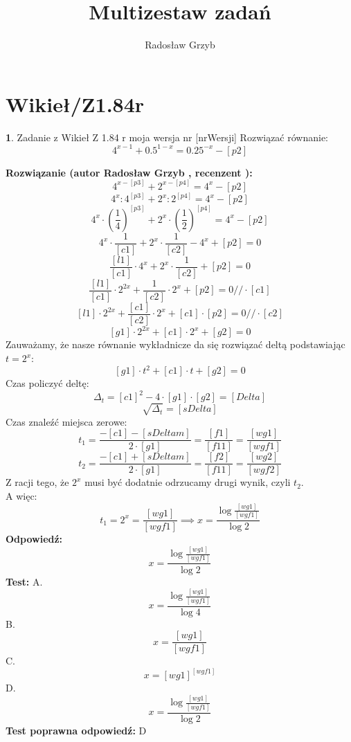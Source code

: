 \documentclass[12pt, a4paper]{article}
\title{Multizestaw zadań}
\author{Radosław Grzyb}
\date{}
\theoremstyle{definition} %
\newtheorem{zad}{}
\newcommand{\kategoria}[1]{\section{#1}} %
\newcommand{\zadStart}[1]{\begin{zad}#1\newline} %
\newcommand{\zadStop}{\end{zad}}   %
\newcommand{\rozwStart}[2]{\noindent \textbf{Rozwiązanie (autor #1 , recenzent #2): }\newline} %
\newcommand{\rozwStop}{\newline}                                            %
\newcommand{\odpStart}{\noindent \textbf{Odpowiedź:}\newline}    %
\newcommand{\odpStop}{\newline}                                             %
\newcommand{\testStart}{\noindent \textbf{Test:}\newline} %
\newcommand{\testStop}{\newline} %
\newcommand{\kluczStart}{\noindent \textbf{Test poprawna odpowiedź:}\newline} %
\newcommand{\kluczStop}{\newline} %
\begin{document}
\maketitle
\kategoria{Wikieł/Z1.84r}
\zadStart{Zadanie z Wikieł Z 1.84 r moja wersja nr [nrWersji]}
Rozwiązać równanie:
$$4^{x-1}+0.5^{1-x}=0.25^{-x}-[p2]$$
\zadStop
\rozwStart{Radosław Grzyb}{}
$$4^{x-[p3]}+2^{x-[p4]}=4^{x}-[p2]$$
$$4^{x}:4^{[p3]}+2^{x}:2^{[p4]}=4^{x}-[p2]$$
$$4^{x}\cdot(\frac{1}{4})^{[p3]}+2^{x}\cdot(\frac{1}{2})^{[p4]}=4^{x}-[p2]$$
$$4^{x}\cdot\frac{1}{[c1]}+2^{x}\cdot\frac{1}{[c2]}-4^{x}+[p2]=0$$
$$\frac{[l1]}{[c1]}\cdot4^{x}+2^{x}\cdot\frac{1}{[c2]}+[p2]=0$$
$$\frac{[l1]}{[c1]}\cdot2^{2x}+\frac{1}{[c2]}\cdot2^{x}+[p2]=0 //\cdot[c1]$$
$$[l1]\cdot2^{2x}+\frac{[c1]}{[c2]}\cdot2^{x}+[c1]\cdot[p2]=0 //\cdot[c2]$$
$$[g1]\cdot2^{2x}+[c1]\cdot2^{x}+[g2]=0$$
Zauważamy, że nasze równanie wykładnicze da się rozwiązać deltą podstawiając $t=2^{x}$:
$$[g1]\cdot t^{2}+[c1]\cdot t+[g2]=0$$
Czas policzyć deltę:
$$\Delta_{t}=[c1]^{2}-4\cdot[g1]\cdot[g2]=[Delta]$$
$$\sqrt{\Delta_{t}}=[sDelta]$$
Czas znaleźć miejsca zerowe:
$$t_{1}=\frac{-[c1]-[sDeltam]}{2\cdot[g1]}=\frac{[f1]}{[f11]}=\frac{[wg1]}{[wgf1]}$$
$$t_{2}=\frac{-[c1]+[sDeltam]}{2\cdot[g1]}=\frac{[f2]}{[f11]}=\frac{[wg2]}{[wgf2]}$$
Z racji tego, że $2^{x}$ musi być dodatnie odrzucamy drugi wynik, czyli $t_{2}$.\\
A więc:
$$t_{1}=2^{x}=\frac{[wg1]}{[wgf1]}\implies x=\frac{\log\frac{[wg1]}{[wgf1]}}{\log2}$$
\rozwStop
\odpStart
$$x=\frac{\log\frac{[wg1]}{[wgf1]}}{\log2}$$
\odpStop
\testStart
A. $$x=\frac{\log\frac{[wg1]}{[wgf1]}}{\log4}$$
B. $$x=\frac{[wg1]}{[wgf1]}$$
C. $$x=[wg1]^{[wgf1]}$$
D. $$x=\frac{\log\frac{[wg1]}{[wgf1]}}{\log2}$$
\testStop
\kluczStart
D
\kluczStop
\end{document}
